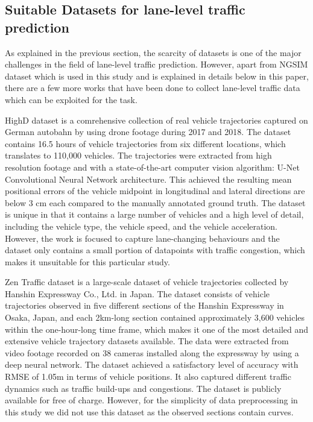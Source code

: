 \documentclass[11pt]{uonthesis}
\begin{document}
\subsection{Suitable Datasets for lane-level traffic prediction}
As explained in the previous section, the scarcity of datasets is one of the major challenges in the field of lane-level traffic prediction. However, apart from NGSIM dataset which is used in this study and is explained in details below in this paper, there are a few more works that have been done to collect lane-level traffic data which can be exploited for the task. 

HighD dataset\cite{highDdataset} is a comrehensive collection of real vehicle trajectories captured on German autobahn by using drone footage during 2017 and 2018. The dataset contains 16.5 hours of vehicle trajectories from six different locations, which translates to 110,000 vehicles. The trajectories were extracted from high resolution footage and with a state-of-the-art computer vision algorithm: U-Net Convolutional Neural Network architecture. This achieved the resulting mean positional errors of the vehicle midpoint in longitudinal and lateral directions are below 3 cm each compared to the manually annotated ground truth. The dataset is unique in that it contains a large number of vehicles and a high level of detail, including the vehicle type, the vehicle speed, and the vehicle acceleration. However, the work is focused to capture lane-changing behaviours and the dataset only contains a small portion of datapoints with traffic congestion, which makes it unsuitable for this particular study.

Zen Traffic dataset\cite{zen} is a large-scale dataset of vehicle trajectories collected by Hanshin Expressway Co., Ltd. in Japan. The dataset consists of vehicle trajectories observed in five different sections of the Hanshin Expressway in Osaka, Japan, and each 2km-long section contained approximately 3,600 vehicles within the one-hour-long time frame, which makes it one of the most detailed and extensive vehicle trajectory datasets available. The data were extracted from video footage recorded on 38 cameras installed along the expressway by using a deep neural network. The dataset achieved a satisfactory level of accuracy with RMSE of 1.05m in terms of vehicle positions\cite{seo2020evaluation}. It also captured different traffic dynamics such as traffic build-ups and congestions. The dataset is publicly available for free of charge. However, for the simplicity of data preprocessing in this study we did not use this dataset as the observed sections contain curves.
\end{document}
